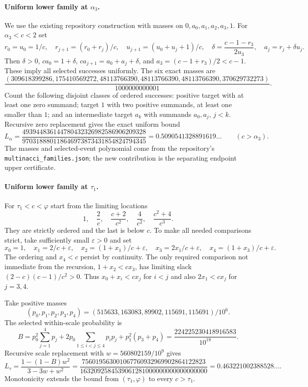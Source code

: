 \documentclass[11pt]{article}
\begin{document}
\paragraph{Uniform lower family at $\alpha_3$.}
We use the existing repository construction with masses on
$0,a_0,a_1,a_2,a_3,1$. For $\alpha_3<c<2$ set
\[
r_0=u_0=1/c,\quad r_{j+1}=(r_0+r_j)/c,\quad
u_{j+1}=(u_0+u_j+1)/c,\quad
\delta=\frac{c-1-r_3}{2u_3},\quad a_j=r_j+\delta u_j.
\]
Then $\delta>0$, $ca_0=1+\delta$,
$ca_{j+1}=a_0+a_j+\delta$, and
$a_3=(c-1+r_3)/2<c-1$. These imply all selected successes uniformly.
The six exact masses are
\[
\frac{(309618399286,175410569272,48113766390,
48113766390,48113766390,370629732273)}{1000000000001}.
\]
Count the following disjoint classes of ordered successes: positive
target with at least one zero summand; target $1$ with two positive
summands, at least one smaller than $1$; and an intermediate target
$a_k$ with summands $a_0,a_j$, $j<k$. Recursive zero replacement gives
the exact uniform bound
\[
L_\alpha=
\frac{493944836144780432326982586906209328}
{970318880118646973873431854824794345}
=0.5090541328891619\ldots\qquad(c>\alpha_3).
\]
The masses and selected-event polynomial come from the repository's
\texttt{multinacci\_families.json}; the new contribution is the separating
endpoint upper certificate.

\paragraph{Uniform lower family at $\tau_1$.}
For $\tau_1<c<\varphi$ start from the limiting locations
\[
1,\quad \frac2c,\quad \frac{c+2}{c^2},\quad
\frac4{c^2},\quad \frac{c^2+4}{c^3}.
\]
They are strictly ordered and the last is below $c$. To make all
needed comparisons strict, take sufficiently small $\varepsilon>0$ and set
\[
x_0=1,\quad x_1=2/c+\varepsilon,\quad
x_2=(1+x_1)/c+\varepsilon,\quad
x_3=2x_1/c+\varepsilon,\quad
x_4=(1+x_3)/c+\varepsilon.
\]
The ordering and $x_4<c$ persist by continuity. The only required
comparison not immediate from the recursion, $1+x_2<cx_3$, has limiting
slack $(2-c)(c-1)/c^2>0$. Thus $x_0+x_i<cx_j$ for $i<j$ and also
$2x_1<cx_j$ for $j=3,4$.

Take positive masses
\[
(p_0,p_1,p_2,p_3,p_4)
=(515633,163083,89902,115691,115691)/10^6.
\]
The selected within-scale probability is
\[
B=p_0^2\sum_{j=1}^4p_j
+2p_0\sum_{1\le i<j\le4}p_i p_j+p_1^2(p_3+p_4)
=\frac{224225230418916583}{10^{18}}.
\]
Recursive scale replacement with $w=560802159/10^9$ gives
\[
L_\tau=\frac{1-(1-B)w^2}{3-3w+w^2}
=\frac{756019563001067760932969902864122823}
{1632092584539061281000000000000000000}
=0.463221002388528\ldots.
\]
Monotonicity extends the bound from $(\tau_1,\varphi)$ to every
$c>\tau_1$.
\end{document}
